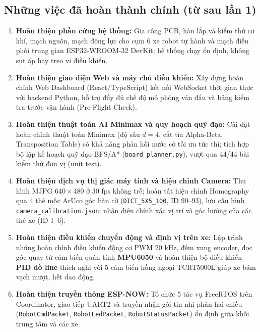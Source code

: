 \documentclass[14pt,a4paper]{extreport}
\begin{document}
\subsection*{Những việc đã hoàn thành chính (từ sau lần 1)}
\begin{enumerate}
    \item \textbf{Hoàn thiện phần cứng hệ thống:} Gia công PCB, hàn lắp và kiểm thử cơ khí, mạch nguồn, mạch động lực cho cụm 6 xe robot tự hành và mạch điều phối trung gian ESP32-WROOM-32 DevKit; hệ thống chạy ổn định, không sụt áp hay treo vi điều khiển.
    \item \textbf{Hoàn thiện giao diện Web và máy chủ điều khiển:} Xây dựng hoàn chỉnh Web Dashboard (React/TypeScript) kết nối WebSocket thời gian thực với backend Python, hỗ trợ đầy đủ chế độ mô phỏng ván đấu và bảng kiểm tra trước vận hành (Pre-Flight Check).
    \item \textbf{Hoàn thiện thuật toán AI Minimax và quy hoạch quỹ đạo:} Cài đặt hoàn chỉnh thuật toán Minimax (độ sâu $d=4$, cắt tỉa Alpha-Beta, Transposition Table) có khả năng phản hồi nước cờ tối ưu tức thì; tích hợp bộ lập kế hoạch quỹ đạo BFS/A* (\texttt{board\_planner.py}), vượt qua 44/44 bài kiểm thử đơn vị (unit test).
    \item \textbf{Hoàn thiện dịch vụ thị giác máy tính và hiệu chỉnh Camera:} Thu hình MJPG $640\times480$ ở 30 fps không trễ; hoàn tất hiệu chỉnh Homography qua 4 thẻ mốc ArUco góc bàn cờ (\texttt{DICT\_5X5\_100}, ID 90--93), lưu cấu hình \texttt{camera\_calibration.json}; nhận diện chính xác vị trí và góc hướng của các thẻ xe (ID 1--6).
    \item \textbf{Hoàn thiện điều khiển chuyển động và định vị trên xe:} Lập trình nhúng hoàn chỉnh điều khiển động cơ PWM 20 kHz, đếm xung encoder, đọc góc quay từ cảm biến quán tính \textbf{MPU6050} và hoàn thiện bộ điều khiển \textbf{PID dò line} thích nghi với 5 cảm biến hồng ngoại TCRT5000L giúp xe bám vạch mượt, hết dao động.
    \item \textbf{Hoàn thiện truyền thông ESP-NOW:} Tổ chức 5 tác vụ FreeRTOS trên Coordinator, giao tiếp UART2 và truyền nhận gói tin nhị phân hai chiều (\texttt{RobotCmdPacket}, \texttt{RobotLedPacket}, \texttt{RobotStatusPacket}) ổn định giữa khối trung tâm và các xe.
\end{enumerate}
\end{document}
